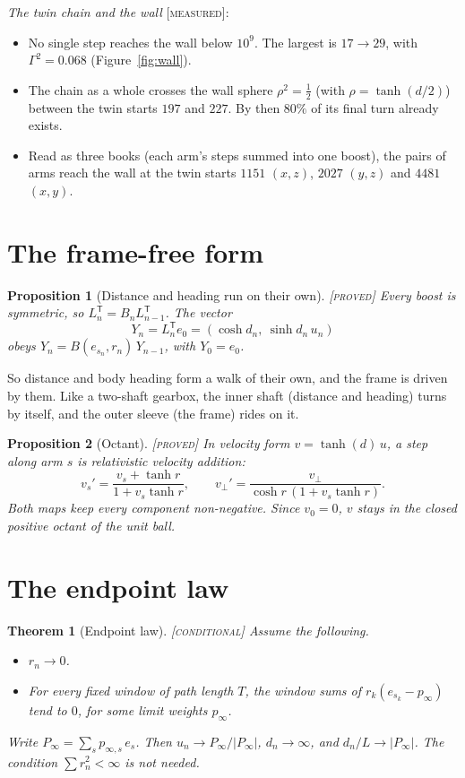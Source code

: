 \documentclass[11pt]{article}
\newtheorem{theorem}{Theorem}
\newtheorem{proposition}{Proposition}
\theoremstyle{definition}
\theoremstyle{remark}
\newcommand{\grade}[1]{\textsc{[#1]}}
\begin{document}
\noindent\emph{The twin chain and the wall} \grade{measured}:
\begin{itemize}
\item No single step reaches the wall below $10^9$. The largest is $17\to29$, with $\Gamma^2=0.068$ (Figure~\ref{fig:wall}).
\item The chain as a whole crosses the wall sphere $\rho^2=\tfrac12$ (with $\rho=\tanh(d/2)$) between the twin starts $197$ and $227$. By then $80\%$ of its final turn already exists.
\item Read as three books (each arm's steps summed into one boost), the pairs of arms reach the wall at the twin starts $1151$ $(x,z)$, $2027$ $(y,z)$ and $4481$ $(x,y)$.
\end{itemize}

\section{The frame-free form}

\begin{proposition}[Distance and heading run on their own] \grade{proved}
Every boost is symmetric, so $L_n^{\mathsf T}=B_nL_{n-1}^{\mathsf T}$. The vector
\[
Y_n=L_n^{\mathsf T}e_0=(\cosh d_n,\ \sinh d_n\,u_n)
\]
obeys $Y_n=B(e_{s_n},r_n)\,Y_{n-1}$, with $Y_0=e_0$.
\end{proposition}

\noindent So distance and body heading form a walk of their own, and the frame is driven by them. Like a two-shaft gearbox, the inner shaft (distance and heading) turns by itself, and the outer sleeve (the frame) rides on it.

\begin{proposition}[Octant] \grade{proved}
In velocity form $v=\tanh(d)\,u$, a step along arm $s$ is relativistic velocity addition:
\[
v_s'=\frac{v_s+\tanh r}{1+v_s\tanh r},\qquad v_\perp'=\frac{v_\perp}{\cosh r\,(1+v_s\tanh r)}.
\]
Both maps keep every component non-negative. Since $v_0=0$, $v$ stays in the closed positive octant of the unit ball.
\end{proposition}

\section{The endpoint law}

\begin{theorem}[Endpoint law] \grade{conditional}
Assume the following.
\begin{itemize}
\item[(A1)] $r_n\to0$.
\item[(A2)] For every fixed window of path length $T$, the window sums of $r_k(e_{s_k}-p_\infty)$ tend to $0$, for some limit weights $p_\infty$.
\end{itemize}
Write $P_\infty=\sum_s p_{\infty,s}\,e_s$. Then $u_n\to P_\infty/|P_\infty|$, $d_n\to\infty$, and $d_n/L\to|P_\infty|$. The condition $\sum r_n^2<\infty$ is not needed.
\end{theorem}
\end{document}
